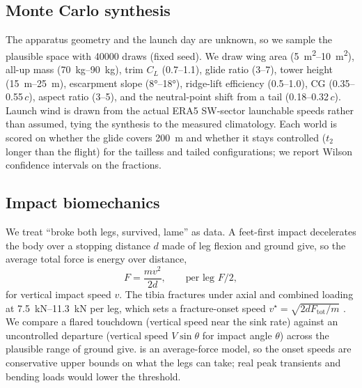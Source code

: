 \subsection{Monte Carlo synthesis}

The apparatus geometry and the launch day are unknown, so we sample the plausible
space with \num{40000} draws (fixed seed).
We draw wing area (\SIrange{5}{10}{\meter\squared}), all-up mass
(\SIrange{70}{90}{\kilogram}), trim \(C_L\) (\numrange{0.7}{1.1}), glide ratio
(\numrange{3}{7}), tower height (\SIrange{15}{25}{\meter}), escarpment slope
(\ang{8}--\ang{18}), ridge-lift efficiency (\numrange{0.5}{1.0}), CG
(\numrange{0.35}{0.55}\,\(c\)), aspect ratio (\numrange{3}{5}), and the neutral-point
shift from a tail (\numrange{0.18}{0.32}\,\(c\)).
Launch wind is drawn from the actual ERA5 SW-sector launchable speeds rather than
assumed, tying the synthesis to the measured climatology.
Each world is scored on whether the glide covers \SI{200}{\meter} and whether it
stays controlled (\(t_2\) longer than the flight) for the tailless and tailed
configurations; we report Wilson confidence intervals on the fractions.

\subsection{Impact biomechanics}

We treat ``broke both legs, survived, lame'' as data.
A feet-first impact decelerates the body over a stopping distance \(d\) made of leg
flexion and ground give, so the average total force is energy over distance,
\begin{equation}
  F = \frac{m v^2}{2 d}, \qquad \text{per leg } F/2,
  \label{eq:impact}
\end{equation}
for vertical impact speed \(v\).
The tibia fractures under axial and combined loading at
\SIrange{7.5}{11.3}{\kilo\newton} per leg, which sets a fracture-onset speed
\(v^\star = \sqrt{2 d F_\mathrm{tot}/m}\)
\autocite{salzar2014leg,abidin2026tibia,forman2012femur,ivarsson2005bending,femurFE2022}.
We compare a flared touchdown (vertical speed near the sink rate) against an
uncontrolled departure (vertical speed \(V\sin\theta\) for impact angle \(\theta\))
across the plausible range of ground give.
 is an average-force model, so the onset speeds are conservative
upper bounds on what the legs can take; real peak transients and bending loads would
lower the threshold.

